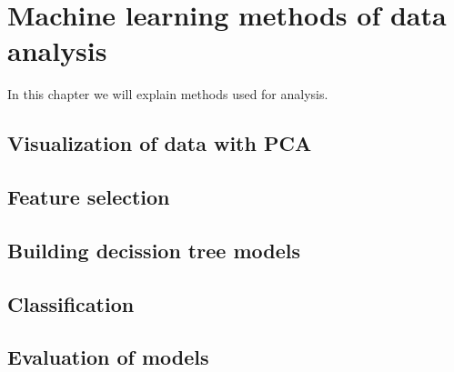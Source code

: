 \chapter{Machine learning methods of data analysis}
In this chapter we will explain methods used for analysis.

\section{Visualization of data with PCA}

\section{Feature selection}

\section{Building decission tree models}

\section{Classification}

\section{Evaluation of models}

